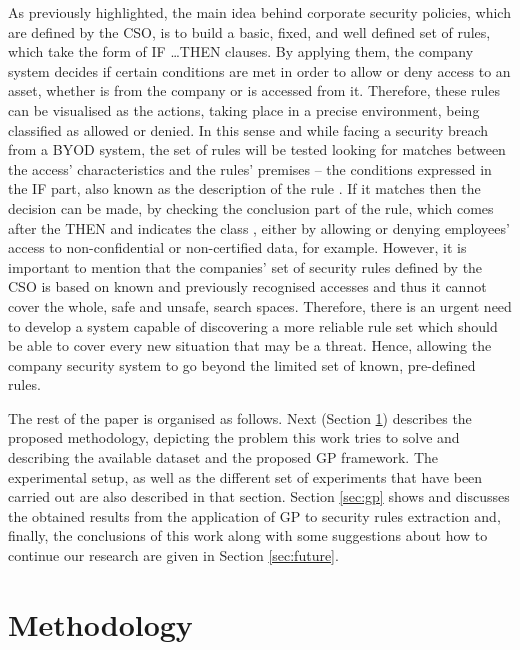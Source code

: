 \documentclass[runningheads]{llncs}
\begin{document}
As previously highlighted, the main idea behind corporate security
policies, which are defined by the CSO, is to build a basic, fixed,
and well defined set of rules, which take the form of \textsc{IF
  \ldots THEN} clauses. By applying them, the company system decides if certain conditions are met in order to allow or
deny access to an asset, whether is from the company or is accessed from it. 
Therefore, these rules can be visualised as the actions, taking place in a precise environment, being classified as
allowed or denied. In this sense and while facing a security breach
from a BYOD system, the set of rules will be tested looking for
matches between the access' characteristics and the rules' premises --
the conditions expressed in the IF part, also known as the description
of the rule \cite{DeFalco2002257}. If it matches then the decision can
be made, by checking the conclusion part of the rule, which comes
after the THEN and indicates the class \cite{DeFalco2002257}, either
by allowing or denying employees' access to non-confidential
 or non-certified data, for example. However, it is important to
 mention that the companies'  set of security rules defined by the CSO is
 based on known and previously recognised accesses and thus it cannot
 cover the whole, safe and unsafe, search spaces. Therefore,
 there is an urgent need to develop a system capable of discovering a
 more reliable rule set which should be able to cover every new
 situation that may be a threat. Hence, allowing the company security
 system to go beyond the limited set of known, pre-defined rules. 

The rest of the paper is organised as follows. Next (Section
\ref{sec:methodology}) describes the proposed methodology, depicting
the problem this work tries to solve and describing the available
dataset and the proposed GP framework. The experimental setup, as
well as the different set of experiments that have been carried out
are also described in that section. Section \ref{sec:gp} shows and discusses the
obtained results from the application of GP to security rules
extraction and, finally, the conclusions of this work along with some
suggestions about how to continue our research are given in Section
\ref{sec:future}.

\section{Methodology}
\label{sec:methodology}
\end{document}
